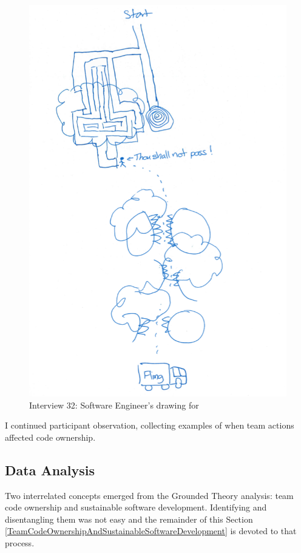 \begin{figure}[htbp]
\centering
\includegraphics[width=\oneColumnWidth{}]{drawings/2016_09_29.png}
\caption{Interview 32: Software Engineer's drawing for }
\label{Interview32}
\end{figure}

I continued participant observation, collecting examples of when team actions affected code ownership. 

\subsection{Data Analysis}
Two interrelated concepts emerged from the Grounded Theory analysis: team code ownership and sustainable software development. Identifying and disentangling them was not easy and the remainder of this Section \ref{TeamCodeOwnershipAndSustainableSoftwareDevelopment} is devoted to that process.

